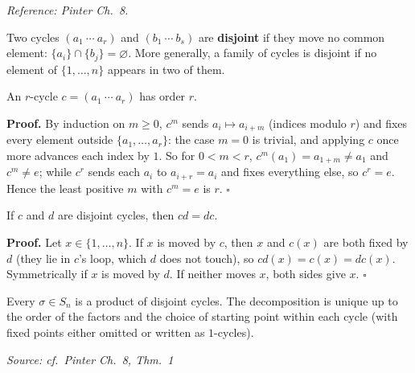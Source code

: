 \documentclass[11pt]{report}
\renewenvironment{proof}[1][Proof]{\noindent\textbf{#1.} }{\hfill$\square$\par\vspace{5pt}}
\newcommand{\srcline}[1]{\par\hfill{\footnotesize\textit{Source: #1}}}
\begin{document}
\textit{Reference: Pinter Ch.\ 8.}

\begin{defbox}\label{def:disjoint-cycles}
Two cycles $(a_1\ \cdots\ a_r)$ and $(b_1\ \cdots\ b_s)$ are \textbf{disjoint} if they move no common element: $\{a_i\} \cap \{b_j\} = \varnothing$. More generally, a family of cycles is disjoint if no element of $\{1, \ldots, n\}$ appears in two of them.
\end{defbox}

\begin{lembox}\label{lem:r-cycle-has-order-r}
An $r$-cycle $c = (a_1\ \cdots\ a_r)$ has order $r$.
\end{lembox}

\begin{proof}
By induction on $m \geq 0$, $c^m$ sends $a_i \mapsto a_{i+m}$ (indices modulo $r$) and fixes every element outside $\{a_1, \ldots, a_r\}$: the case $m = 0$ is trivial, and applying $c$ once more advances each index by $1$. So for $0 < m < r$, $c^m(a_1) = a_{1+m} \neq a_1$ and $c^m \neq e$; while $c^r$ sends each $a_i$ to $a_{i+r} = a_i$ and fixes everything else, so $c^r = e$. Hence the least positive $m$ with $c^m = e$ is $r$.
\end{proof}

\begin{lembox}\label{lem:disjoint-cycles-commute}
If $c$ and $d$ are disjoint cycles, then $cd = dc$.
\end{lembox}

\begin{proof}
Let $x \in \{1, \ldots, n\}$. If $x$ is moved by $c$, then $x$ and $c(x)$ are both fixed by $d$ (they lie in $c$'s loop, which $d$ does not touch), so $cd(x) = c(x) = dc(x)$. Symmetrically if $x$ is moved by $d$. If neither moves $x$, both sides give $x$.
\end{proof}

\begin{thmbox}\label{thm:disjoint-cycle-decomposition}
Every $\sigma \in S_n$ is a product of disjoint cycles. The decomposition is unique up to the order of the factors and the choice of starting point within each cycle (with fixed points either omitted or written as $1$-cycles).
\srcline{cf.\ Pinter Ch.\ 8, Thm.\ 1}
\end{thmbox}
\end{document}
